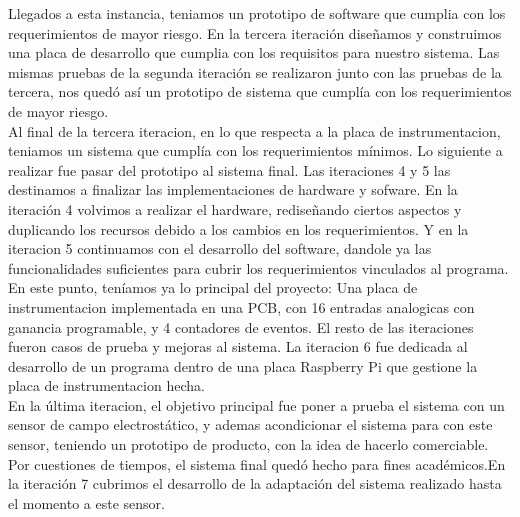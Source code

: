 Llegados a esta instancia, teniamos un prototipo de software que cumplia con los requerimientos de mayor riesgo. En la tercera iteración diseñamos y construimos una placa de desarrollo que cumplia con los requisitos para nuestro sistema. Las mismas pruebas de la segunda iteración se realizaron junto con las pruebas de la tercera, nos quedó así un prototipo de sistema que cumplía con los requerimientos de mayor riesgo. \\

Al final de la tercera iteracion, en lo que respecta a la placa de instrumentacion, teniamos un sistema que cumplía con los requerimientos mínimos. Lo siguiente a realizar fue pasar del prototipo al sistema final. Las iteraciones 4 y 5 las destinamos a finalizar las implementaciones de hardware y sofware. En la iteración 4 volvimos a realizar el hardware, rediseñando ciertos aspectos y duplicando los recursos debido a los cambios en los requerimientos. Y en la iteracion 5 continuamos con el desarrollo del software, dandole ya las funcionalidades suficientes para cubrir los requerimientos vinculados al programa. \\

En este punto, teníamos ya lo principal del proyecto: Una placa de instrumentacion implementada en una PCB, con 16 entradas analogicas con ganancia programable, y 4 contadores de eventos. El resto de las iteraciones fueron casos de prueba y mejoras al sistema. 
La iteracion 6 fue dedicada al desarrollo de un programa dentro de una placa Raspberry Pi que gestione la placa de instrumentacion hecha.  \\

En la última iteracion, el objetivo principal fue poner a prueba el sistema con un sensor de campo electrostático, y ademas acondicionar el sistema para con este sensor, teniendo un prototipo de producto, con la idea de hacerlo comerciable. Por cuestiones de tiempos, el sistema final quedó hecho para fines académicos.En la iteración 7 cubrimos el desarrollo de la adaptación del sistema realizado hasta el momento a este sensor. \\






